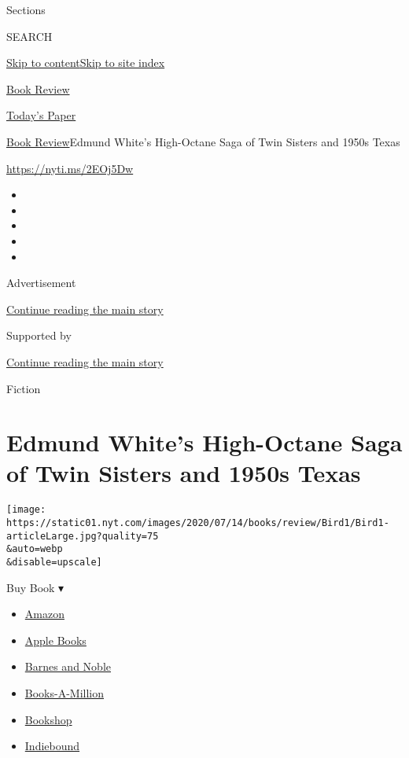 Sections

SEARCH

\protect\hyperlink{site-content}{Skip to
content}\protect\hyperlink{site-index}{Skip to site index}

\href{https://www.nytimes.com/section/books/review}{Book Review}

\href{https://myaccount.nytimes.com/auth/login?response_type=cookie\&client_id=vi}{}

\href{https://www.nytimes.com/section/todayspaper}{Today's Paper}

\href{/section/books/review}{Book Review}\textbar{}Edmund White's
High-Octane Saga of Twin Sisters and 1950s Texas

\url{https://nyti.ms/2EOj5Dw}

\begin{itemize}
\item
\item
\item
\item
\item
\end{itemize}

Advertisement

\protect\hyperlink{after-top}{Continue reading the main story}

Supported by

\protect\hyperlink{after-sponsor}{Continue reading the main story}

Fiction

\hypertarget{edmund-whites-high-octane-saga-of-twin-sisters-and-1950s-texas}{%
\section{Edmund White's High-Octane Saga of Twin Sisters and 1950s
Texas}\label{edmund-whites-high-octane-saga-of-twin-sisters-and-1950s-texas}}

\texttt{[image: https://static01.nyt.com/images/2020/07/14/books/review/Bird1/Bird1-articleLarge.jpg?quality=75\\\&auto=webp\\\&disable=upscale]}

Buy Book ▾

\begin{itemize}
\tightlist
\item
  \href{https://www.amazon.com/gp/search?index=books\&tag=NYTBSREV-20\&field-keywords=A+Saint+From+Texas+Edmund+White}{Amazon}
\item
  \href{https://du-gae-books-dot-nyt-du-prd.appspot.com/buy?title=A+Saint+From+Texas\&author=Edmund+White}{Apple
  Books}
\item
  \href{https://www.anrdoezrs.net/click-7990613-11819508?url=https\%3A\%2F\%2Fwww.barnesandnoble.com\%2Fw\%2F\%3Fean\%3D9781635572551}{Barnes
  and Noble}
\item
  \href{https://www.anrdoezrs.net/click-7990613-35140?url=https\%3A\%2F\%2Fwww.booksamillion.com\%2Fp\%2FA\%2BSaint\%2BFrom\%2BTexas\%2FEdmund\%2BWhite\%2F9781635572551}{Books-A-Million}
\item
  \href{https://bookshop.org/a/3546/9781635572551}{Bookshop}
\item
  \href{https://www.indiebound.org/book/9781635572551?aff=NYT}{Indiebound}
\end{itemize}


